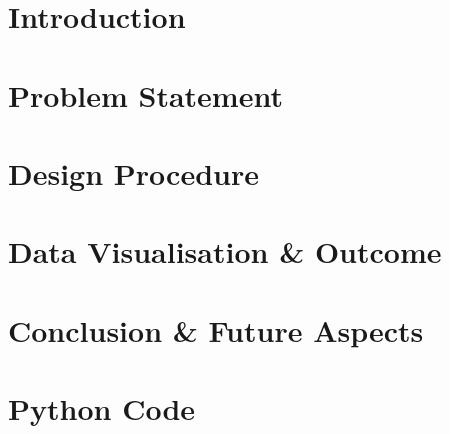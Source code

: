 \documentclass[12pt]{article}
\begin{document}

\tableofcontents
\thispagestyle{empty}

\newpage
\listoffigures
\thispagestyle{empty}

\newpage
\section{Introduction}
\label{Intro}


\newpage
\section{Problem Statement}
\label{ProbStat}


\newpage
\section{Design Procedure}
\label{RadNetDes}


\newpage
\section{Data Visualisation \& Outcome}
\label{DatVis}


\newpage
\section{Conclusion \& Future Aspects}
\label{Conc}


\newpage
\appendix
\section{Python Code}
\label{AppA}



\newpage


\end{document}
